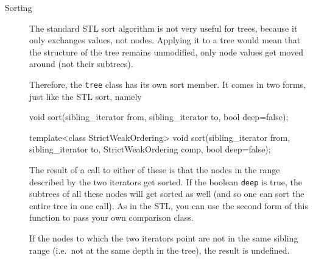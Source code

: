 \documentclass[11pt]{article}
\begin{document}
\begin{sectionunit}
\begin{sectionunit}
\begin{description}
\item[Sorting] The standard STL sort algorithm is not very useful for
trees, because it only exchanges values, not nodes. Applying it to a
tree would mean that the structure of the tree remains unmodified,
only node values get moved around (not their subtrees).

Therefore, the {\tt tree} class has its own sort member. It comes in
two forms, just like the STL sort, namely
\begin{screen}
void     sort(sibling_iterator from, sibling_iterator to, bool deep=false);

template<class StrictWeakOrdering>
void     sort(sibling_iterator from, sibling_iterator to,
              StrictWeakOrdering comp, bool deep=false);
\end{screen}
The result of a call to either of these is that the nodes in the range
described by the two iterators get sorted. If the boolean {\tt deep}
is true, the subtrees of all these nodes will get sorted as well (and
so one can sort the entire tree in one call).  As in the STL, you can
use the second form of this function to pass your own comparison
class.

If the nodes to which the two iterators point are not in the same
sibling range (i.e.~not at the same depth in the tree), the result is undefined.


\end{description}
\end{sectionunit}
\end{sectionunit}
\end{document}
